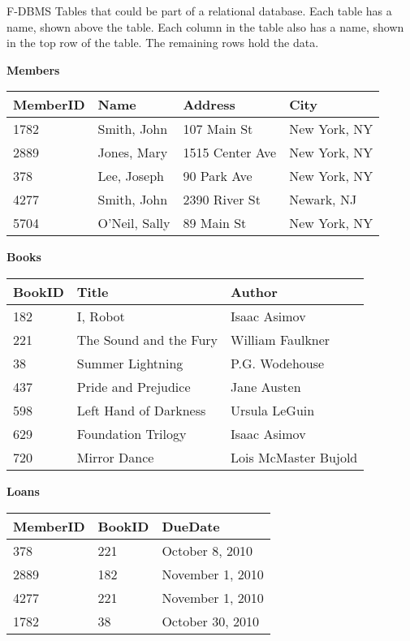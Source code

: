 \fig
  {F-DBMS}
  {Tables that could be part of a relational database.
   Each table has a name, shown above the table.
   Each column in the table also has a name, shown in the top row
   of the table.  The remaining rows hold the data.}
  {\textbf{Members}  
 
   \smallskip
   \begin{tabular}{|l|l|l|l|}
        \hline
        \strut \textbf{MemberID}& \textbf{Name}& \textbf{Address} &\textbf{City}\\
        \hline
        \strut 1782& Smith, John& 107 Main St& New York, NY \\
        2889&  Jones, Mary& 1515 Center Ave& New York, NY\\
        378& Lee, Joseph& 90 Park Ave& New York, NY\\
        4277& Smith, John& 2390 River St& Newark, NJ\\
        5704& O'Neil, Sally& 89 Main St& New York, NY\\
        \hline
     \end{tabular}
     
   \bigskip
   \textbf{Books}
   
   \smallskip
   \begin{tabular}{|l|l|l|}
        \hline
        \strut \textbf{BookID}& \textbf{Title}& \textbf{Author}\\
        \hline
        \strut 182& I, Robot& Isaac Asimov\\
        221& The Sound and the Fury& William Faulkner\\
        38&  Summer Lightning& P.G. Wodehouse\\
        437& Pride and Prejudice& Jane Austen\\
        598& Left Hand of Darkness& Ursula LeGuin\\
        629& Foundation Trilogy& Isaac Asimov\\
        720& Mirror Dance& Lois McMaster Bujold\\
        \hline
     \end{tabular}
     
   \bigskip
   \textbf{Loans}
   
   \smallskip
   \begin{tabular}{|l|l|l|}
        \hline
        \strut \textbf{MemberID}& \textbf{BookID}& \textbf{DueDate}\\
        \hline
        \strut 378&  221& October 8, 2010\\
        2889& 182& November 1, 2010\\
        4277& 221& November 1, 2010\\
        1782& 38&  October 30, 2010\\
        \hline
     \end{tabular}
   }

